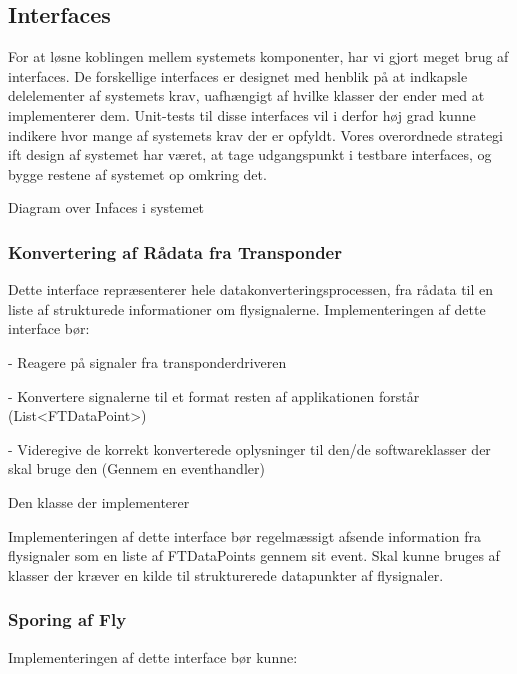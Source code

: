 
\subsection{Interfaces}
For at løsne koblingen mellem systemets komponenter, har vi gjort meget brug af interfaces. 
De forskellige interfaces er designet med henblik på at indkapsle delelementer af systemets krav, uafhængigt af hvilke klasser der ender med at implementerer dem.
Unit-tests til disse interfaces vil i derfor høj grad kunne indikere hvor mange af systemets krav der er opfyldt. Vores overordnede strategi ift design af systemet har været, at tage udgangspunkt i testbare interfaces, og bygge restene af systemet op omkring det.

 {Diagram over Infaces i systemet}

\subsubsection{Konvertering af Rådata fra Transponder}

Dette interface repræsenterer hele datakonverteringsprocessen, fra rådata til en liste af strukturede informationer om flysignalerne.
Implementeringen af dette interface bør:

- Reagere på signaler fra transponderdriveren

- Konvertere signalerne til et format resten af applikationen forstår (List<FTDataPoint>)

- Videregive de korrekt konverterede oplysninger til den/de softwareklasser der skal bruge den (Gennem en eventhandler)

Den klasse der implementerer

Implementeringen af dette interface bør regelmæssigt afsende information fra flysignaler som en liste af FTDataPoints gennem sit event. Skal kunne bruges af klasser der kræver en kilde til strukturerede datapunkter af flysignaler.
\subsubsection{Sporing af Fly}


Implementeringen af dette interface bør kunne:

